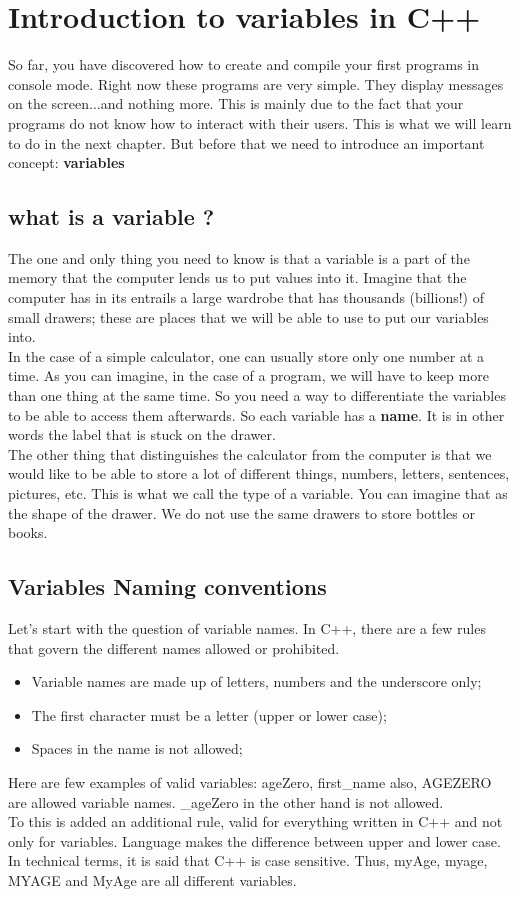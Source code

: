 \documentclass[11pt, a4paper]{article}
\begin{document}
\section{Introduction to variables in C++}
So far, you have discovered how to create and compile your first programs in console mode.
Right now these programs are very simple. They display messages on the screen...and nothing
more. This is mainly due to the fact that your programs do not know how to interact
with their users. This is what we will learn to do in the next chapter. But before that we need
to introduce an important concept: \textbf{variables}

\subsection{what is a variable ?}
The one and only thing you need to know is that a variable is a part of the memory that the computer
lends us to put values into it. Imagine that the computer has in its entrails a large wardrobe that
has thousands (billions!) of small drawers; these are places that we will be able to
use to put our variables into.\\
In the case of a simple calculator, one can usually store only one number at a time. As you can
imagine, in the case of a program, we will have to keep more than one thing at the same time.
So you need a way to differentiate the variables to be able to access them afterwards.
So each variable has a \textbf{name}. It is in other words the label that is stuck on the drawer.
\\The other thing that distinguishes the calculator from the computer is that we would like to
be able to store a lot of different things, numbers, letters, sentences, pictures, etc.
This is what we call the type of a variable. You can imagine that as the shape of the drawer.
We do not use the same drawers to store bottles or books.

\subsection{Variables Naming conventions}
Let’s start with the question of variable names. In C++, there are a few rules that
govern the different names allowed or prohibited.
\begin{itemize}
\item Variable names are made up of letters, numbers and the underscore only;
\item The first character must be a letter (upper or lower case);
\item Spaces in the name is not allowed;
\end{itemize}
Here are few examples of valid variables: ageZero, first\_name also, AGEZERO are
allowed variable names. \_ageZero in the other hand is not allowed.\\
To this is added an additional rule, valid for everything written in C++ and not
only for variables. Language makes the difference between upper and lower case.
In technical terms, it is said that C++ is case sensitive. Thus, myAge, myage, MYAGE and
MyAge are all different variables.\\
\end{document}

